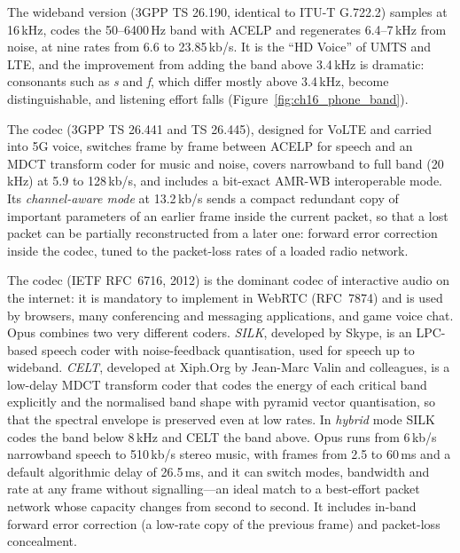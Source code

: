 \begin{description}[style=nextline,leftmargin=1.2em,font=\sffamily\bfseries\small\color{navy}]
\item[AMR-WB (2001).] The wideband version (3GPP TS 26.190, identical to ITU-T G.722.2) samples at
16\,kHz, codes the 50--6400\,Hz band with ACELP and regenerates 6.4--7\,kHz from noise, at nine rates
from 6.6 to 23.85\,kb/s. It is the ``HD Voice'' of UMTS and LTE, and the improvement from adding the
band above 3.4\,kHz is dramatic: consonants such as \emph{s} and \emph{f}, which differ mostly above
3.4\,kHz, become distinguishable, and listening effort falls (Figure~\ref{fig:ch16_phone_band}).
\item[EVS (2014).] The  codec (3GPP TS 26.441 and TS 26.445), designed
for VoLTE and carried into 5G voice, switches frame by frame between ACELP for speech and an MDCT
transform coder for music and noise, covers narrowband to full band (20\,kHz) at 5.9 to 128\,kb/s, and
includes a bit-exact AMR-WB interoperable mode. Its \emph{channel-aware mode} at 13.2\,kb/s sends a
compact redundant copy of important parameters of an earlier frame inside the current packet, so that
a lost packet can be partially reconstructed from a later one: forward error correction inside the
codec, tuned to the packet-loss rates of a loaded radio network.
\end{description}


\begin{inpractice}
The  codec (IETF RFC~6716, 2012) is the dominant codec of interactive audio on the
internet: it is mandatory to implement in WebRTC (RFC~7874) and is used by browsers, many
conferencing and messaging applications, and game voice chat. Opus combines two very different
coders. \emph{SILK}, developed by Skype, is an LPC-based speech coder with noise-feedback quantisation,
used for speech up to wideband. \emph{CELT}, developed at Xiph.Org by Jean-Marc Valin and colleagues,
is a low-delay MDCT transform coder that codes the energy of each critical band explicitly and the
normalised band shape with pyramid vector quantisation, so that the spectral envelope is preserved
even at low rates. In \emph{hybrid} mode SILK codes the band below 8\,kHz and CELT the band above.
Opus runs from 6\,kb/s narrowband speech to 510\,kb/s stereo music, with frames from 2.5 to 60\,ms and
a default algorithmic delay of 26.5\,ms, and it can switch modes, bandwidth and rate at any frame
without signalling---an ideal match to a best-effort packet network whose capacity changes from
second to second. It includes in-band forward error correction (a low-rate copy of the previous
frame) and packet-loss concealment.
\end{inpractice}


